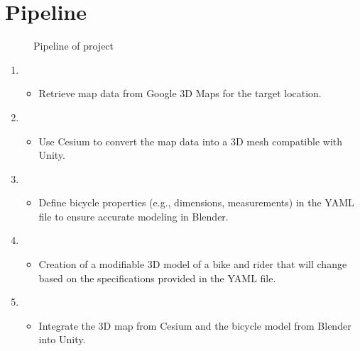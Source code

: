 \documentclass[letterpaper,10pt,english]{jupyterBook}
\begin{document}
\section{Pipeline}
\label{\detokenize{Introduction:pipeline}}
\begin{figure}[htbp]
\centering
\capstart

\noindent{}
\caption{Pipeline of project}\label{\detokenize{Introduction:id1}}\end{figure}
\begin{enumerate}
%
\item {} 
\sphinxAtStartPar
{}
\begin{itemize}
\item {} 
\sphinxAtStartPar
Retrieve map data from Google 3D Maps for the target location.

\end{itemize}

\item {} 
\sphinxAtStartPar
{}
\begin{itemize}
\item {} 
\sphinxAtStartPar
Use Cesium to convert the map data into a 3D mesh compatible with Unity.

\end{itemize}

\item {} 
\sphinxAtStartPar
{}
\begin{itemize}
\item {} 
\sphinxAtStartPar
Define bicycle properties (e.g., dimensions, measurements) in the YAML file to ensure accurate modeling in Blender.

\end{itemize}

\item {} 
\sphinxAtStartPar
{}
\begin{itemize}
\item {} 
\sphinxAtStartPar
Creation of a modifiable 3D model of a bike and rider that will change based on the specifications provided in the YAML file.

\end{itemize}

\item {} 
\sphinxAtStartPar
{}
\begin{itemize}
\item {} 
\sphinxAtStartPar
Integrate the 3D map from Cesium and the bicycle model from Blender into Unity.


\end{itemize}
\end{enumerate}
\end{document}
